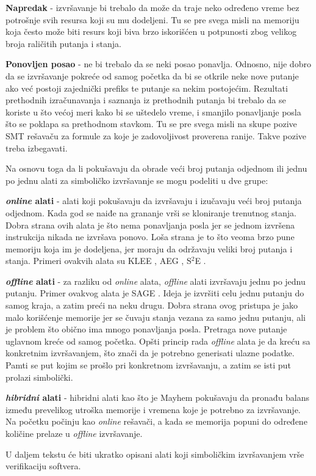 \documentclass[12pt,oneside]{memoir}
\begin{document}
\begin{description}
    \item \textbf{Napredak} - izvršavanje bi trebalo da može da traje neko određeno vreme bez potrošnje svih resursa koji su mu dodeljeni. Tu se pre svega misli na memoriju koja često može biti resurs koji biva brzo iskorišćen u potpunosti zbog velikog broja raličitih putanja i stanja.
    
    \item \textbf{Ponovljen posao} - ne bi trebalo da se neki posao ponavlja. Odnosno, nije dobro da se izvršavanje pokreće od samog početka da bi se otkrile neke nove putanje ako već postoji zajednički prefiks te putanje sa nekim postojećim. Rezultati prethodnih izračunavanja i saznanja iz prethodnih putanja bi trebalo da se koriste u što većoj meri kako bi se uštedelo vreme, i smanjilo ponavljanje posla što se poklapa sa prethodnom stavkom. Tu se pre svega misli na skupe pozive SMT rešavaču za formule za koje je zadovoljivost proverena ranije. Takve pozive treba izbegavati.
    
\end{description}
\bigskip
Na osnovu toga da li pokušavaju da obrade veći broj putanja odjednom ili jednu po jednu alati za simboličko izvršavanje se mogu podeliti u dve grupe:
\begin{description}
    \item \textbf{\textit{online} alati} - alati koji pokušavaju da izvršavaju i izučavaju veći broj putanja odjednom. Kada god se naiđe na grananje vrši se kloniranje trenutnog stanja. Dobra strana ovih alata je što nema ponavljanja posla jer se jednom izvršena instrukcija nikada ne izvršava ponovo. Loša strana je to što veoma brzo pune memoriju koja im je dodeljena, jer moraju da održavaju veliki broj putanja i stanja. Primeri ovakvih alata su KLEE \cite{klee}, AEG \cite{aeg}, S$^2$E \cite{s2e}.
    
    \item \textbf{\textit{offline} alati} - za razliku od \textit{online} alata, \textit{offline} alati izvršavaju jednu po jednu putanju. Primer ovakvog alata je SAGE \cite{sage}. Ideja je izvršiti celu jednu putanju do samog kraja, a zatim preći na neku drugu. Dobra strana ovog pristupa je jako malo korišćenje memorije jer se čuvaju stanja vezana za samo jednu putanju, ali je problem što obično ima mnogo ponavljanja posla. Pretraga nove putanje uglavnom kreće od samog početka. Opšti princip rada \textit{offline} alata je da kreću sa konkretnim izvršavanjem, što znači da je potrebno generisati ulazne podatke. Pamti se put kojim se prošlo pri konkretnom izvršavanju, a zatim se isti put prolazi simbolički. 
    
    \item \textbf{\textit{hibridni} alati} - hibridni alati kao što je Mayhem \cite{mayhem} pokušavaju da pronađu balans između prevelikog utroška memorije i vremena koje je potrebno za izvršavanje. Na početku počinju kao \textit{online} rešavači, a kada se memorija popuni do određene količine prelaze u \textit{offline} izvršavanje.
\end{description}
\bigskip
U daljem tekstu će biti ukratko opisani alati koji simboličkim izvršavanjem vrše verifikaciju softvera.
\end{document}
